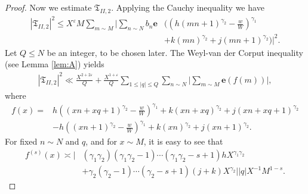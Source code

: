 \documentclass[12pt, reqno, twoside, letterpaper]{amsart}
\numberwithin{equation}{section}
\theoremstyle{customthm}
\theoremstyle{customrem}
\begin{document}
\begin{proof}
	Now we estimate $\mathfrak{T}_{II,2}$.
	Applying the Cauchy inequality we have
	\begin{align*}
		|\mathfrak{T}_{II,2}|^2\leqslant X^{\varepsilon}M\sum_{m\sim M}
		\Bigg|\sum_{n\sim N}b_n\mathbf{e}&\bigg(\left(h(mn+1)^{\gamma_2}-\frac{w}{W}\right)^{\gamma_1}\\
		&+k(mn)^{\gamma_2}+j(mn+1)^{\gamma_2}\bigg)\Bigg|^2.
	\end{align*}
	Let $Q\leqslant N$ be an integer, to be chosen later. The Weyl-van der Corput inequality
   (see Lemma \ref{lem:A}) yields
	\begin{align*}
		|\mathfrak{T}_{II,2}|^2\ll\frac{X^{2+2\varepsilon}}{Q}
		+\frac{X^{1+\varepsilon}}{Q}\sum_{1\leqslant |q|\leqslant Q}
		\sum_{n\sim N}\Bigg|\sum_{m\sim M}\mathbf{e}(f(m))\Bigg|,
	\end{align*}
	where
	\begin{align*}
		f(x)=&h\left((xn+xq+1)^{\gamma_2}-\frac{w}{W}\right)^{\gamma_1}
		+k(xn+xq)^{\gamma_2}+j(xn+xq+1)^{\gamma_2}\\
		&-h\left((xn+1)^{\gamma_2}-\frac{w}{W}\right)^{\gamma_1}
		+k(xn)^{\gamma_2}+j(xn+1)^{\gamma_2}.
	\end{align*}
	For fixed $n\sim N$ and $q$, and for $x\sim M$, it is easy to see that
	\begin{align*}
		f^{(s)}(x)\asymp\Big|&(\gamma_1\gamma_2)(\gamma_1\gamma_2-1)\cdots(\gamma_1\gamma_2-s+1)
		hX^{\gamma_1\gamma_2}\\
		&+\gamma_2(\gamma_2-1)\cdots(\gamma_2-s+1)(j+k)X^{\gamma_2}\Big||q|X^{-1}M^{1-s}.
	\end{align*}
	

\end{proof}
\end{document}
